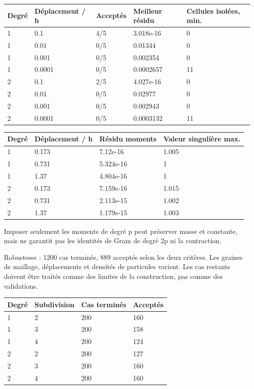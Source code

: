 \documentclass[10pt,a4paper]{article}
\begin{document}
\begin{center}\small\begin{tabular}{lllll}\toprule
Degré & Déplacement / h & Acceptés & Meilleur résidu & Cellules isolées, min.\\\midrule
1 & 0.1 & 4/5 & 3.018e-16 & 0\\
1 & 0.01 & 0/5 & 0.01344 & 0\\
1 & 0.001 & 0/5 & 0.002354 & 0\\
1 & 0.0001 & 0/5 & 0.0002657 & 11\\
2 & 0.1 & 2/5 & 4.027e-16 & 0\\
2 & 0.01 & 0/5 & 0.02977 & 0\\
2 & 0.001 & 0/5 & 0.002943 & 0\\
2 & 0.0001 & 0/5 & 0.0003132 & 11\\
\bottomrule\end{tabular}\end{center}
\begin{center}\small\begin{tabular}{llll}\toprule
Degré & Déplacement / h & Résidu moments & Valeur singulière max.\\\midrule
1 & 0.173 & 7.12e-16 & 1.005\\
1 & 0.731 & 5.324e-16 & 1\\
1 & 1.37 & 4.804e-16 & 1\\
2 & 0.173 & 7.159e-16 & 1.015\\
2 & 0.731 & 2.113e-15 & 1.002\\
2 & 1.37 & 1.179e-15 & 1.003\\
\bottomrule\end{tabular}\end{center}
Imposer seulement les moments de degré p peut préserver masse et constante, mais ne garantit pas les identités de Gram de degré 2p ni la contraction.

Robustesse : 1200 cas terminés, 889 acceptés selon les deux critères. Les graines de maillage, déplacements et densités de particules varient. Les cas restants doivent être traités comme des limites de la construction, pas comme des validations.

\begin{center}\small\begin{tabular}{llll}\toprule
Degré & Subdivision & Cas terminés & Acceptés\\\midrule
1 & 2 & 200 & 160\\
1 & 3 & 200 & 158\\
1 & 4 & 200 & 124\\
2 & 2 & 200 & 127\\
2 & 3 & 200 & 160\\
2 & 4 & 200 & 160\\
\bottomrule\end{tabular}\end{center}
\end{document}
